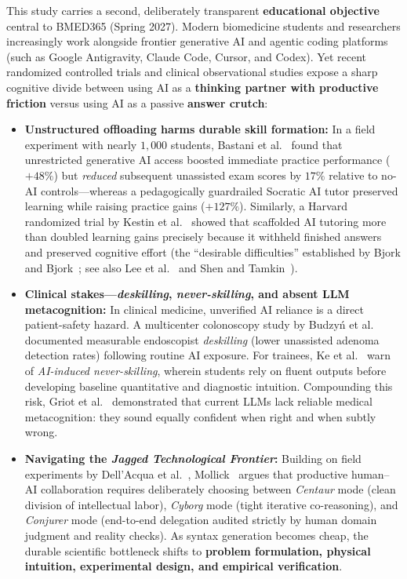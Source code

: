 \documentclass[10pt,a4paper]{article}
\renewcommand{\_}{\origunderscore\allowbreak}
\begin{document}
This study carries a second, deliberately transparent \textbf{educational objective} central to BMED365 (Spring 2027). Modern biomedicine students and researchers increasingly work alongside frontier generative AI and agentic coding platforms (such as Google Antigravity, Claude Code, Cursor, and Codex). Yet recent randomized controlled trials and clinical observational studies expose a sharp cognitive divide between using AI as a \textbf{thinking partner with productive friction} versus using AI as a passive \textbf{answer crutch}:

\begin{itemize}
    \item \textbf{Unstructured offloading harms durable skill formation:} In a field experiment with nearly $1{,}000$ students, Bastani et al.~\cite{bastani2025pnas} found that unrestricted generative AI access boosted immediate practice performance ($+48\%$) but \emph{reduced} subsequent unassisted exam scores by $17\%$ relative to no-AI controls---whereas a pedagogically guardrailed Socratic AI tutor preserved learning while raising practice gains ($+127\%$). Similarly, a Harvard randomized trial by Kestin et al.~\cite{kestin2025scirep} showed that scaffolded AI tutoring more than doubled learning gains precisely because it withheld finished answers and preserved cognitive effort (the ``desirable difficulties'' established by Bjork and Bjork~\cite{bjork2011desirable}; see also Lee et al.~\cite{lee2025chi} and Shen and Tamkin~\cite{shen2026skillformation}).
    \item \textbf{Clinical stakes---\emph{deskilling}, \emph{never-skilling}, and absent LLM metacognition:} In clinical medicine, unverified AI reliance is a direct patient-safety hazard. A multicenter colonoscopy study by Budzy\'n et al.~\cite{budzyn2025deskilling} documented measurable endoscopist \emph{deskilling} (lower unassisted adenoma detection rates) following routine AI exposure. For trainees, Ke et al.~\cite{ke2026neverskilling} warn of \emph{AI-induced never-skilling}, wherein students rely on fluent outputs before developing baseline quantitative and diagnostic intuition. Compounding this risk, Griot et al.~\cite{griot2025metacognition} demonstrated that current LLMs lack reliable medical metacognition: they sound equally confident when right and when subtly wrong.
    \item \textbf{Navigating the \emph{Jagged Technological Frontier}:} Building on field experiments by Dell'Acqua et al.~\cite{dellacqua2023jagged}, Mollick~\cite{mollick2026coexistence} argues that productive human--AI collaboration requires deliberately choosing between \emph{Centaur} mode (clean division of intellectual labor), \emph{Cyborg} mode (tight iterative co-reasoning), and \emph{Conjurer} mode (end-to-end delegation audited strictly by human domain judgment and reality checks). As syntax generation becomes cheap, the durable scientific bottleneck shifts to \textbf{problem formulation, physical intuition, experimental design, and empirical verification}.
\end{itemize}
\end{document}
